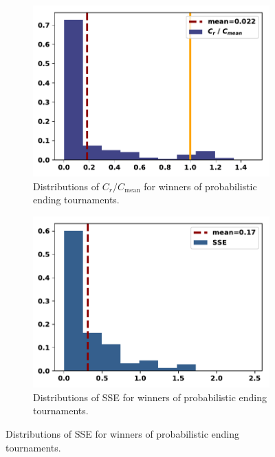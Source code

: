 \documentclass{article}
\begin{document}
\begin{figure}[!htbp]
    \centering
    \begin{subfigure}{0.35\textwidth}
        \centering
        \includegraphics[width=\textwidth]{../images/compared_to_mean_probend.pdf}
        \caption{Distributions of \(C_r / C_{\text{mean}}\) for winners of probabilistic ending tournaments.}
    \end{subfigure}
    \begin{subfigure}{0.35\textwidth}
        \centering
        \includegraphics[width=\textwidth]{../images/sse_probend.pdf}
        \caption{Distributions of SSE for winners of probabilistic ending tournaments.}
    \end{subfigure}
\end{figure}
\end{document}
